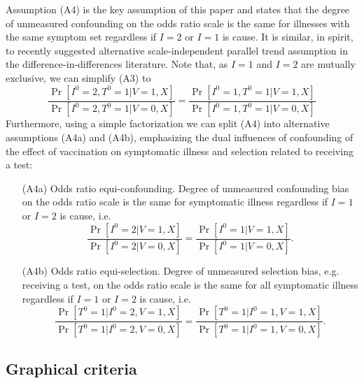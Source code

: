 \documentclass[11pt]{article}
\begin{document}
Assumption (A4) is the key assumption of this paper and states that the degree of unmeasured confounding on the odds ratio scale is the same for illnesses with the same symptom set regardless if $I=2$ or $I=1$ is cause. It is similar, in spirit, to recently suggested alternative scale-independent parallel trend assumption in the difference-in-differences literature. Note that, as $I = 1$ and $I = 2$ are mutually exclusive, we can simplify (A3) to
\begin{equation}
    \frac{\Pr[I^0 = 2, T^0 = 1 | V = 1, X]}{\Pr[I^0 = 2, T^0 = 1 | V = 0, X]} =\frac{\Pr[I^0 = 1, T^0 = 1 | V = 1, X]}{\Pr[I^0 = 1, T^0 = 1 | V = 0, X]}
\end{equation}
Furthermore, using a simple factorization we can split (A4) into alternative assumptions (A4a) and (A4b), emphasizing the dual influences of confounding of the effect of vaccination on symptomatic illness and selection related to receiving a test:
\begin{itemize}
    \item[(A4a)] Odds ratio equi-confounding. Degree of unmeasured confounding bias on the odds ratio scale is the same for symptomatic illness regardless if $I=1$ or $I=2$ is cause, i.e. 
    $$\frac{\Pr[I^0 = 2 | V = 1, X]}{\Pr[I^0 = 2 | V = 0, X]} =\frac{\Pr[I^0 = 1 | V = 1, X]}{\Pr[I^0 = 1 | V = 0, X]}.$$
    \item[(A4b)] Odds ratio equi-selection. Degree of unmeasured selection bias, e.g. receiving a test, on the odds ratio scale is the same for all symptomatic illness regardless if $I=1$ or $I=2$ is cause, i.e. 
    $$\frac{\Pr[T^0 = 1 | I^0 = 2, V = 1, X]}{\Pr[T^0 = 1 | I^0 = 2, V = 0, X]} =\frac{\Pr[T^0 = 1 | I^0 = 1, V = 1, X]}{\Pr[T^0 = 1 | I^0 = 1, V = 0, X]}.$$
\end{itemize}

\subsection{Graphical criteria} \label{sec:graphical}
\end{document}
